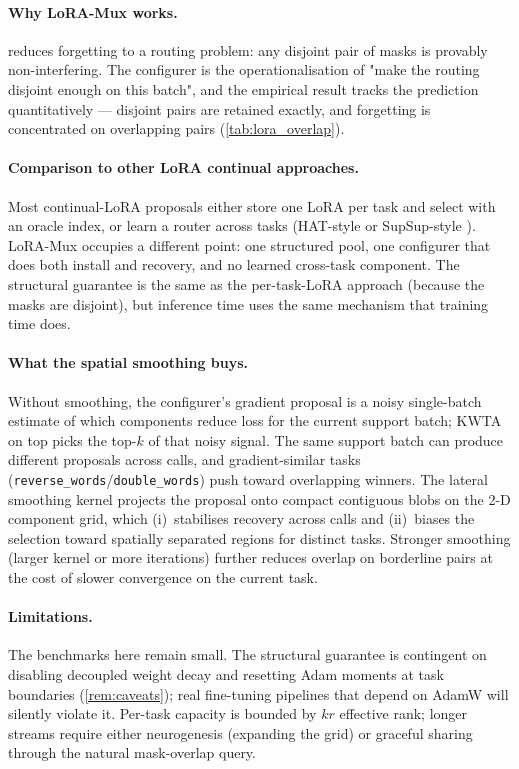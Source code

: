 \documentclass{article}
\theoremstyle{plain}
\theoremstyle{remark}
\begin{document}
\paragraph{Why LoRA-Mux works.}
 reduces forgetting to a routing problem: any disjoint pair of masks is provably non-interfering. The configurer is the operationalisation of "make the routing disjoint enough on this batch", and the empirical result tracks the prediction quantitatively — disjoint pairs are retained exactly, and forgetting is concentrated on overlapping pairs (\cref{tab:lora_overlap}).

\paragraph{Comparison to other LoRA continual approaches.}
Most continual-LoRA proposals either store one LoRA per task and select with an oracle index, or learn a router across tasks (HAT-style or SupSup-style \citep{serra2018overcoming,wortsman2020supermasks}). LoRA-Mux occupies a different point: one structured pool, one configurer that does both install and recovery, and no learned cross-task component. The structural guarantee is the same as the per-task-LoRA approach (because the masks are disjoint), but inference time uses the same mechanism that training time does.

\paragraph{What the spatial smoothing buys.}
Without smoothing, the configurer's gradient proposal is a noisy single-batch estimate of which components reduce loss for the current support batch; KWTA on top picks the top-$k$ of that noisy signal. The same support batch can produce different proposals across calls, and gradient-similar tasks (\texttt{reverse\_words}/\texttt{double\_words}) push toward overlapping winners. The lateral smoothing kernel projects the proposal onto compact contiguous blobs on the 2-D component grid, which (i)~stabilises recovery across calls and (ii)~biases the selection toward spatially separated regions for distinct tasks. Stronger smoothing (larger kernel or more iterations) further reduces overlap on borderline pairs at the cost of slower convergence on the current task.

\paragraph{Limitations.}
The benchmarks here remain small. The structural guarantee is contingent on disabling decoupled weight decay and resetting Adam moments at task boundaries (\cref{rem:caveats}); real fine-tuning pipelines that depend on AdamW will silently violate it. Per-task capacity is bounded by $kr$ effective rank; longer streams require either neurogenesis (expanding the grid) or graceful sharing through the natural mask-overlap query.
\end{document}
